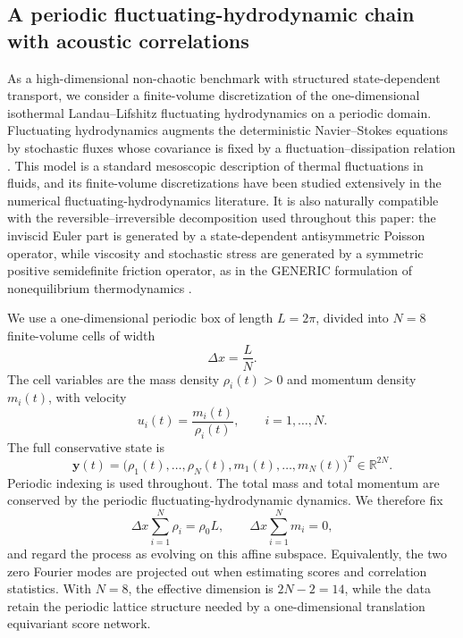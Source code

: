 \documentclass[11pt,twoside,fleqn]{article}
\begin{document}
\subsection{A periodic fluctuating-hydrodynamic chain with acoustic correlations}
\label{subsec:fluctuating_hydrodynamic_chain}

As a high-dimensional non-chaotic benchmark with structured
state-dependent transport, we consider a finite-volume
discretization of the
one-dimensional isothermal Landau--Lifshitz fluctuating hydrodynamics on a
periodic domain. Fluctuating hydrodynamics augments the deterministic
Navier--Stokes equations by stochastic fluxes whose covariance is fixed by a
fluctuation--dissipation relation \cite{LandauLifshitzFluidMechanics,
BellGarciaWilliams2007,DonevVandenEijndenGarciaBell2010}. This model is a
standard mesoscopic description of thermal fluctuations in fluids, and its
finite-volume discretizations have been studied extensively in the numerical
fluctuating-hydrodynamics literature. It is also naturally compatible with the
reversible--irreversible decomposition used throughout this paper: the inviscid
Euler part is generated by a state-dependent antisymmetric Poisson operator,
while viscosity and stochastic stress are generated by a symmetric positive
semidefinite friction operator, as in the GENERIC formulation of nonequilibrium
thermodynamics \cite{GrmelaOttinger1997,OttingerGrmela1997,Ottinger2005}.

We use a one-dimensional periodic box of length \(L=2\pi\), divided into
\(N=8\) finite-volume cells of width
\begin{equation}
    \Delta x = \frac{L}{N}.
    \label{eq:fhd_dx}
\end{equation}
The cell variables are the mass density \(\rho_i(t)>0\) and momentum density
\(m_i(t)\), with velocity
\begin{equation}
    u_i(t)=\frac{m_i(t)}{\rho_i(t)},
    \qquad
    i=1,\ldots,N.
    \label{eq:fhd_velocity_definition}
\end{equation}
The full conservative state is
\begin{equation}
    \bm{y}(t)
    =
    \bigl(\rho_1(t),\ldots,\rho_N(t),
          m_1(t),\ldots,m_N(t)\bigr)^T
    \in \mathbb{R}^{2N}.
    \label{eq:fhd_state_definition}
\end{equation}
Periodic indexing is used throughout. The total mass and total momentum are
conserved by the periodic fluctuating-hydrodynamic dynamics. We therefore fix
\begin{equation}
    \Delta x\sum_{i=1}^{N}\rho_i = \rho_0 L,
    \qquad
    \Delta x\sum_{i=1}^{N}m_i = 0,
    \label{eq:fhd_conserved_quantities}
\end{equation}
and regard the process as evolving on this affine subspace. Equivalently, the
two zero Fourier modes are projected out when estimating scores and correlation
statistics. With \(N=8\), the effective dimension is \(2N-2=14\), while the data
retain the periodic lattice structure needed by a one-dimensional translation
equivariant score network.
\end{document}
